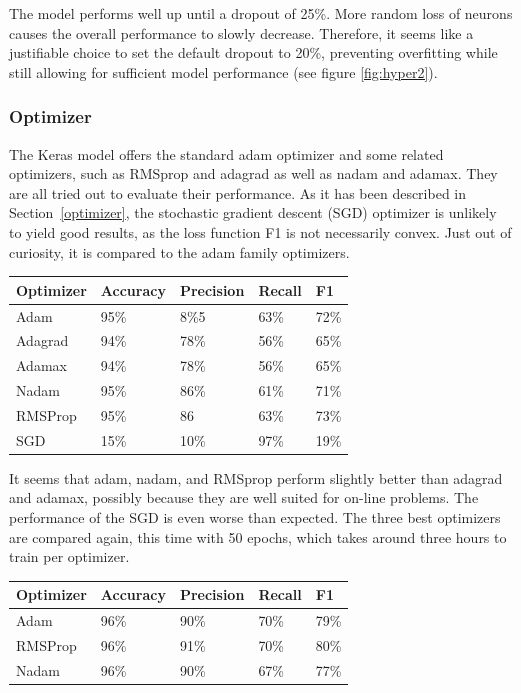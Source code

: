\documentclass[
a4paper,
pagesize,
pdftex,
12pt,
ngerman,
fleqn,
final,
]{scrartcl}
\begin{document}
	The model performs well up until a dropout of 25\%. More random loss of neurons causes the overall performance to slowly decrease. Therefore, it seems like a justifiable choice to set the default dropout to 20\%, preventing overfitting while still allowing for sufficient model performance (see figure \ref{fig:hyper2}).

	\subsubsection{Optimizer}
	
	The Keras model offers the standard adam optimizer and some related optimizers, such as RMSprop and adagrad as well as nadam and adamax. They are all tried out to evaluate their performance. As it has been described in Section~\ref{optimizer}, the stochastic gradient descent (SGD) optimizer is unlikely to yield good results, as the loss function F1 is not necessarily convex. Just out of curiosity, it is compared to the adam family optimizers. 
	
	\begin{tabular}{ | p{3cm} || p{2cm}|p{2cm}|p{2cm}|p{2cm}|  }
		\hline
		\textbf{Optimizer} & \textbf{Accuracy} & \textbf{Precision} & \textbf{Recall} & \textbf{F1} \\
		\hline
		Adam & 95\% &  8\%5 &  63\% &  72\% \\  
		Adagrad & 94\% &  78\% &  56\% &  65\% \\ 
		Adamax & 94\% &  78\% &  56\% &  65\% \\ 
		Nadam & 95\% &  86\% &  61\% &  71\% \\ 
		RMSProp & 95\% &  86 &  63\% &  73\% \\ 
		SGD & 15\% &  10\% &  97\% & 19\% \\
		\hline
		\hline
	\end{tabular}
	
	It seems that adam, nadam, and RMSprop perform slightly better than adagrad and adamax, possibly because they are well suited for on-line problems. The performance of the SGD is even worse than expected. The three best optimizers are compared again, this time with 50 epochs, which takes around three hours to train per optimizer.
	
	\begin{tabular}{ | p{3cm} || p{2cm}|p{2cm}|p{2cm}|p{2cm}|  }
		\hline
		\textbf{Optimizer} & \textbf{Accuracy} & \textbf{Precision} & \textbf{Recall} & \textbf{F1} \\
		\hline
		Adam & 96\%& 90\%& 70\%& 79\% \\
		RMSProp & 96\% &  91\% &  70\% &  80\% \\ 
		Nadam & 96\% & 90\% & 67\% & 77\%\\
		\hline
		\hline
	\end{tabular}
	
\end{document}
